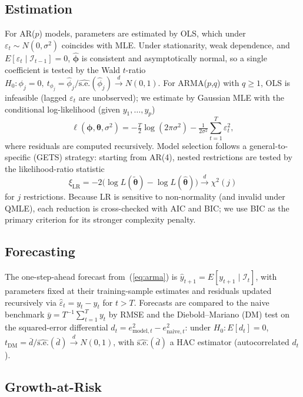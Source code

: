 \documentclass[12pt]{article}
\begin{document}
\subsection{Estimation}

For AR($p$) models, parameters are estimated by OLS, which under $\varepsilon_t\sim N(0,\sigma^2)$ coincides with MLE. Under stationarity, weak dependence, and $E[\varepsilon_t\mid\mathcal{I}_{t-1}]=0$, $\hat{\boldsymbol{\phi}}$ is consistent and asymptotically normal, so a single coefficient is tested by the Wald $t$-ratio $H_0\colon \phi_j=0,\ t_{\phi_j} = \hat\phi_j/\widehat{\mathrm{s.e.}}(\hat\phi_j)\xrightarrow{d} N(0,1)$.
\newline
For ARMA($p$,$q$) with $q\geq 1$, OLS is infeasible (lagged $\varepsilon_t$ are unobserved); we estimate by Gaussian MLE with the conditional log-likelihood (given $y_1,\ldots,y_p$)
$$
\ell(\boldsymbol{\phi},\boldsymbol{\theta},\sigma^2)= -\tfrac{T}{2}\log(2\pi\sigma^2)-\tfrac{1}{2\sigma^2}\sum_{t=1}^{T}\varepsilon_t^2,
$$
where residuals are computed recursively.
\newline
Model selection follows a general-to-specific (GETS) strategy: starting from AR(4), nested restrictions are tested by the likelihood-ratio statistic
$$
\xi_{\mathrm{LR}}=-2\bigl(\log L(\tilde{\boldsymbol{\theta}})-\log L(\hat{\boldsymbol{\theta}})\bigr)\xrightarrow{d}\chi^2(j)
$$
for $j$ restrictions. Because LR is sensitive to non-normality (and invalid under QMLE), each reduction is cross-checked with AIC and BIC; we use BIC as the primary criterion for its stronger complexity penalty.


\subsection{Forecasting}

The one-step-ahead forecast from~(\ref{eq:arma}) is $\hat{y}_{t+1}=E[y_{t+1}\mid\mathcal{I}_t]$, with parameters fixed at their training-sample estimates and residuals updated recursively via $\hat{\varepsilon}_t = y_t - \hat{y}_t$ for $t>T$. Forecasts are compared to the naive benchmark $\bar{y} = T^{-1}\sum_{t=1}^{T} y_t$ by RMSE and the Diebold--Mariano (DM) test on the squared-error differential $d_t = e_{\mathrm{model},t}^2 - e_{\mathrm{naive},t}^2$: under $H_0\colon E[d_t]=0$, $t_{\mathrm{DM}} = \bar{d}/\widehat{\mathrm{s.e.}}(\bar{d}) \xrightarrow{d} N(0,1)$, with $\widehat{\mathrm{s.e.}}(\bar{d})$ a HAC estimator (autocorrelated $d_t$).

\subsection{Growth-at-Risk}
\end{document}
